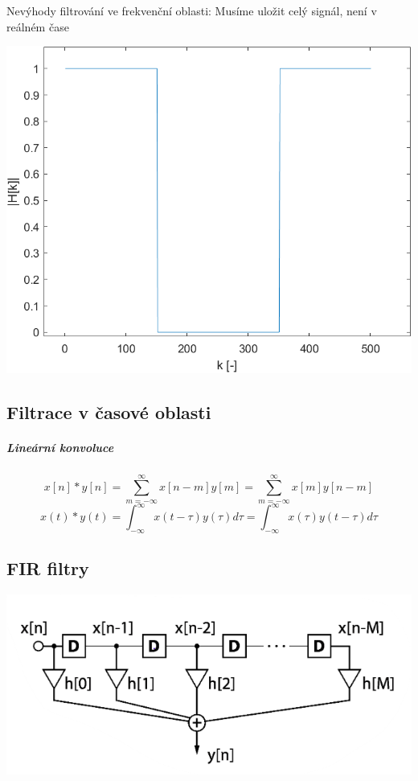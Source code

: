\documentclass{article}
\begin{document}
		Nevýhody filtrování ve frekvenční oblasti: Musíme uložit celý signál, není v reálném čase

		\begin{center}
			\includegraphics{untitled1.png}
		\end{center}
		
	\subsection*{Filtrace v časové oblasti}
		\subparagraph*{Lineární konvoluce}
		\[x[n] \ast y[n] = \sum_{m=-\infty}^{\infty}x[n-m]y[m]
		= \sum_{m = -\infty}^{\infty}x[m]y[n-m]\]
		\[x(t) \ast y(t) = \int_{-\infty}^{\infty} x(t-\tau)y(\tau)d\tau
		= \int_{-\infty}^{\infty}x(\tau) y(t-\tau)d\tau\]

	\subsection*{FIR filtry}
	\begin{center}
		\includegraphics{FIR.png}
	\end{center}
		
\end{document}
